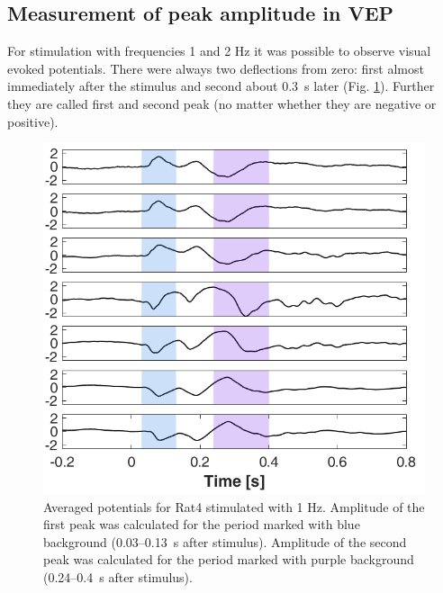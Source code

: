 \documentclass{pracalicmgr}
\begin{document}
   \subsection{Measurement of peak amplitude in VEP}
   For stimulation with frequencies 1 and 2 Hz it was possible to observe visual evoked potentials. There were always two deflections from zero: first almost immediately after the stimulus and second about 0.3~s later (Fig. \ref{rys:wybor_pikow}). Further they are called first and second peak (no matter whether they are negative or positive).
   \begin{figure}[H]
   	\begin{center}
   		\includegraphics[scale=0.55]{wybor_pikow.png}
   	\end{center}
   	\caption{Averaged potentials for Rat4 stimulated with 1 Hz. Amplitude of the first peak was calculated for the period marked with blue background (0.03--0.13~s after stimulus). Amplitude of the second peak was calculated for the period marked with purple background (0.24--0.4~s after stimulus).}
   	\label{rys:wybor_pikow}
   \end{figure} 
   
\end{document}
